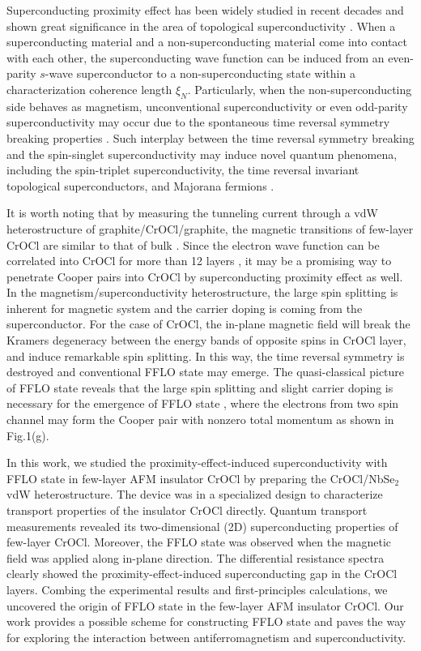 \documentclass[%
 reprint,
superscriptaddress,
 amsmath,amssymb,
 aps,
]{revtex4-2}
\begin{document}
Superconducting proximity effect has been widely studied in recent decades and shown great significance in the area of topological superconductivity \cite{Kane}. When a superconducting material and a non-superconducting material come into contact with each other, the superconducting wave function can be induced from an even-parity $s$-wave superconductor to a non-superconducting state within a characterization coherence length $\xi_N$. Particularly, when the non-superconducting side behaves as magnetism, unconventional superconductivity or even odd-parity superconductivity may occur due to the spontaneous time reversal symmetry breaking properties \cite{Spintriplet2006, Spintriplet2010, Spintriplet2016, Spintriplet2021}. Such interplay between the time reversal symmetry breaking and the spin-singlet superconductivity may induce novel quantum phenomena, including the spin-triplet superconductivity, the time reversal invariant topological superconductors, and Majorana fermions \cite{Spintriplet2006, Spintriplet2010,  Spintriplet2016, Spintriplet2021, Topological1, Topological2}.

It is worth noting that by measuring the tunneling current through a vdW heterostructure of graphite/CrOCl/graphite, the magnetic transitions of few-layer CrOCl are similar to that of bulk \cite{CrOCl}. Since the electron wave function can be correlated into CrOCl for more than 12 layers \cite{CrOCl}, it may be a promising way to penetrate Cooper pairs into CrOCl by superconducting proximity effect as well. In the magnetism/superconductivity heterostructure, the large spin splitting is inherent for magnetic system and the carrier doping is coming from the superconductor. For the case of CrOCl, the in-plane magnetic field will break the Kramers degeneracy between the energy bands of opposite spins in CrOCl layer, and induce remarkable spin splitting. In this way, the time reversal symmetry is destroyed and conventional FFLO state may emerge. The quasi-classical picture of FFLO state reveals that the large spin splitting and slight carrier doping is necessary for the emergence of FFLO state \cite{FFLO_PRX}, where the electrons from two spin channel may form the Cooper pair with nonzero total momentum as shown in Fig.1(g).


In this work, we studied the proximity-effect-induced superconductivity with FFLO state in few-layer AFM insulator CrOCl by preparing the CrOCl/NbSe$_2$ vdW heterostructure. The device was in a specialized design to characterize transport properties of the insulator CrOCl directly. Quantum transport measurements revealed its two-dimensional (2D) superconducting properties of few-layer CrOCl. Moreover, the FFLO state was observed when the magnetic field was applied along in-plane direction. The differential resistance spectra clearly showed the proximity-effect-induced superconducting gap in the CrOCl layers. Combing the experimental results and first-principles calculations, we uncovered the origin of FFLO state in the few-layer AFM insulator CrOCl. Our work provides a possible scheme for constructing FFLO state and paves the way for exploring the interaction between antiferromagnetism and superconductivity.
\end{document}

